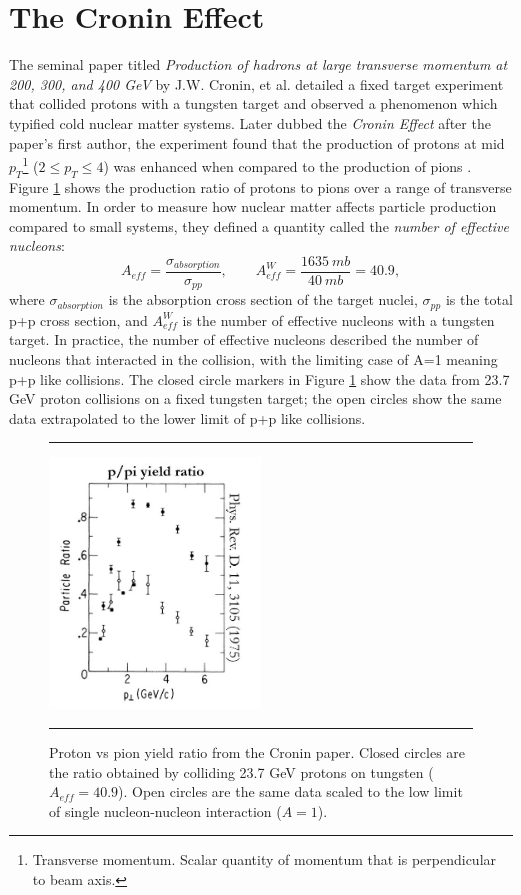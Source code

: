 \section{The Cronin Effect}
The seminal paper titled \textit{Production of hadrons at large transverse momentum at 200, 300, and 400 GeV} by J.W. Cronin, et al. detailed a fixed target experiment that collided protons with a tungsten target and observed a phenomenon which typified cold nuclear matter systems. Later dubbed the \textit{Cronin Effect} after the paper's first author, the experiment found that the production of protons at mid $p_{T}$\footnote{Transverse momentum. Scalar quantity of momentum that is perpendicular to beam axis.} ($2\leq p_{T} \leq 4$) was enhanced when compared to the production of pions \citep{croninpaper}. Figure \ref{fig:croninratio} shows the production ratio of protons to pions over a range of transverse momentum. In order to measure how nuclear matter affects particle production compared to small systems, they defined a quantity called the \textit{number of effective nucleons}:
\begin{equation}
A_{eff} = \frac{\sigma_{absorption}}{\sigma_{pp}}, \qquad A^W_{eff} = \frac{1635\: mb}{40\: mb} = 40.9,
\end{equation}
where $\sigma_{absorption}$ is the absorption cross section of the target nuclei, $\sigma_{pp}$ is the total p+p cross section, and $A^W_{eff}$ is the number of effective nucleons with a tungsten target. In practice, the number of effective nucleons described the number of nucleons that interacted in the collision, with the limiting case of A=1 meaning p+p like collisions. The closed circle markers in Figure \ref{fig:croninratio} show the data from 23.7 GeV proton collisions on a fixed tungsten target; the open circles show the same data extrapolated to the lower limit of p+p like collisions.
\begin{figure}[htbp!]
  \centering    \rule{35em}{0.5pt}
    \includegraphics[width=0.5\textwidth]{prevplots/croninratio.JPG}

  \caption[Proton vs pion yield ratio from the Cronin paper]{Proton vs pion yield ratio from the Cronin paper. Closed circles are the ratio obtained by colliding 23.7 GeV protons on tungsten ($A_{eff}= 40.9$). Open circles are the same data scaled to the low limit of single nucleon-nucleon interaction ($A=1$).}
  \label{fig:croninratio}    \rule{35em}{0.5pt}
\end{figure}


